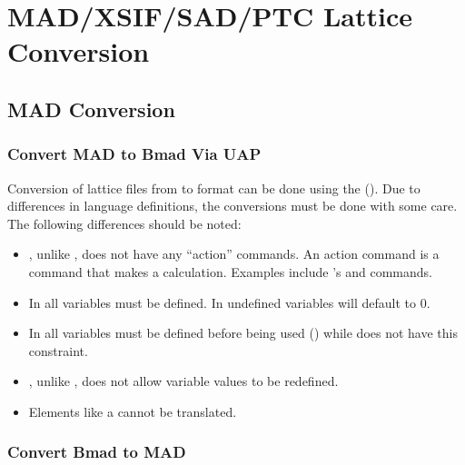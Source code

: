 \chapter{MAD/XSIF/SAD/PTC Lattice Conversion}
\label{c:lat.convert}

\section{MAD Conversion}
\label{s:mad.convert}

\subsection{Convert MAD to Bmad Via UAP}
\label{s:mad.bmad.uap}

Conversion of lattice files from \mad to \bmad format can be done using the  (). 
Due to differences in language definitions, the conversions must be done with some
care. The following differences should be noted:
  \begin{itemize}
  \item
\bmad, unlike \mad, does not have any ``action'' commands. An action
command is a command that makes a calculation. Examples include \mad's
 and  commands.
  \item
In \bmad all variables must be defined. In \mad undefined variables
will default to 0.
  \item
In \bmad all variables must be defined before being used
() while \mad does not have this constraint.
  \item
\bmad, unlike \mad, does not allow variable values to be redefined.
  \item
Elements like a  cannot be translated.
  \end{itemize}

\subsection{Convert Bmad to MAD}
\label{s:bmad.mad}

